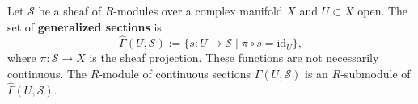 Let $\mathcal{S}$ be a sheaf of $R$-modules over a complex manifold $X$ and $U \subset X$ open. The set of \textbf{generalized sections} is
$$
\hat{\Gamma}(U, \mathcal{S}) := \{ s : U \to \mathcal{S} \mid \pi \circ s = \text{id}_U \},
$$
where $\pi : \mathcal{S} \to X$ is the sheaf projection. These functions are not necessarily continuous. The $R$-module of continuous sections $\Gamma(U, \mathcal{S})$ is an $R$-submodule of $\hat{\Gamma}(U, \mathcal{S})$.
